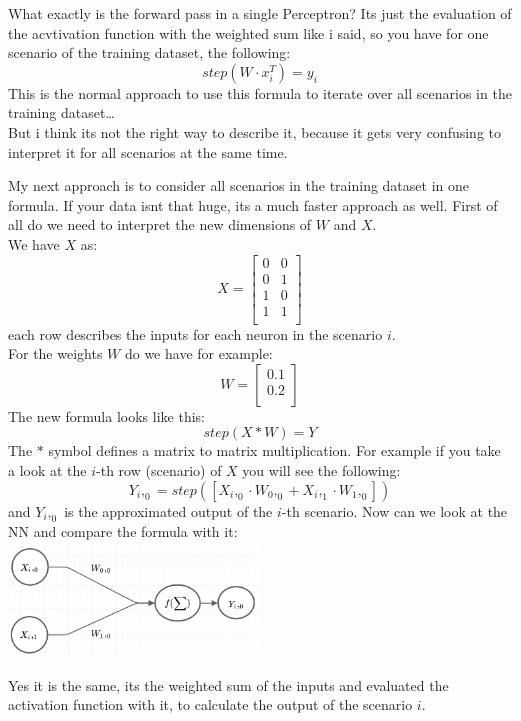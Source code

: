 \documentclass[
]{book}
\begin{document}
What exactly is the forward pass in a single Perceptron? Its just the evaluation of the acvtivation function with the weighted sum like i said, so you have for one scenario of the training dataset, the following:
\[
  step(W \cdot x^T_i) = y_i
\]
This is the normal approach to use this formula to iterate over all scenarios in the training dataset\ldots{}\\
But i think its not the right way to describe it, because it gets very confusing to interpret it for all scenarios at the same time.

My next approach is to consider all scenarios in the training dataset in one formula. If your data isnt that huge, its a much faster approach as well. First of all do we need to interpret the new dimensions of \(W\) and \(X\).\\
We have \(X\) as:
\[
  X = \left[
  \begin{array}{cc}
  0 & 0 \\
  0 & 1 \\
  1 & 0 \\
  1 & 1 \\
  \end{array}
  \right]
\]
each row describes the inputs for each neuron in the scenario \(i\).\\
For the weights \(W\) do we have for example:
\[
  W =\left[
  \begin{array}{c}
  0.1 \\ 
  0.2 \\ 
  \end{array}
  \right]
\]
The new formula looks like this:
\[
  step(X * W) = Y
\]
The \(*\) symbol defines a matrix to matrix multiplication. For example if you take a look at the \(i\)-th row (scenario) of \(X\) you will see the following:
\[
  Y_i,_0 = step([X_i,_0 \cdot W_0,_0 + X_i,_1 \cdot W_1,_0 ])
\]
and \(Y_i,_0\) is the approximated output of the \(i\)-th scenario. Now can we look at the NN and compare the formula with it:\\
\includegraphics[width=0.5\textwidth,height=\textheight]{./img/NN_01_v4.png}

Yes it is the same, its the weighted sum of the inputs and evaluated the activation function with it, to calculate the output of the scenario \(i\).
\end{document}

